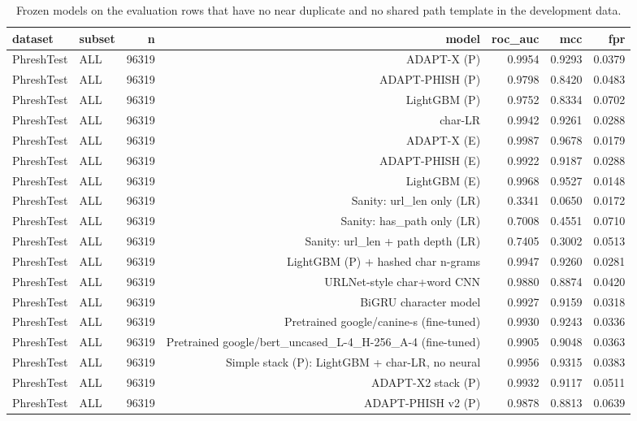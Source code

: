 \begin{table}[t]
\centering
\scriptsize
\caption{Frozen models on the evaluation rows that have no near duplicate and no shared path template in the development data.}
\label{tab:rev_R5_metrics_without_near_duplicates}
\begin{tabular}{llrrrrr}
\toprule
dataset & subset & n & model & roc\_auc & mcc & fpr \\
\midrule
PhreshTest & ALL & 96319 & ADAPT-X (P) & 0.9954 & 0.9293 & 0.0379 \\
PhreshTest & ALL & 96319 & ADAPT-PHISH (P) & 0.9798 & 0.8420 & 0.0483 \\
PhreshTest & ALL & 96319 & LightGBM (P) & 0.9752 & 0.8334 & 0.0702 \\
PhreshTest & ALL & 96319 & char-LR & 0.9942 & 0.9261 & 0.0288 \\
PhreshTest & ALL & 96319 & ADAPT-X (E) & 0.9987 & 0.9678 & 0.0179 \\
PhreshTest & ALL & 96319 & ADAPT-PHISH (E) & 0.9922 & 0.9187 & 0.0288 \\
PhreshTest & ALL & 96319 & LightGBM (E) & 0.9968 & 0.9527 & 0.0148 \\
PhreshTest & ALL & 96319 & Sanity: url\_len only (LR) & 0.3341 & 0.0650 & 0.0172 \\
PhreshTest & ALL & 96319 & Sanity: has\_path only (LR) & 0.7008 & 0.4551 & 0.0710 \\
PhreshTest & ALL & 96319 & Sanity: url\_len + path depth (LR) & 0.7405 & 0.3002 & 0.0513 \\
PhreshTest & ALL & 96319 & LightGBM (P) + hashed char n-grams & 0.9947 & 0.9260 & 0.0281 \\
PhreshTest & ALL & 96319 & URLNet-style char+word CNN & 0.9880 & 0.8874 & 0.0420 \\
PhreshTest & ALL & 96319 & BiGRU character model & 0.9927 & 0.9159 & 0.0318 \\
PhreshTest & ALL & 96319 & Pretrained google/canine-s (fine-tuned) & 0.9930 & 0.9243 & 0.0336 \\
PhreshTest & ALL & 96319 & Pretrained google/bert\_uncased\_L-4\_H-256\_A-4 (fine-tuned) & 0.9905 & 0.9048 & 0.0363 \\
PhreshTest & ALL & 96319 & Simple stack (P): LightGBM + char-LR, no neural & 0.9956 & 0.9315 & 0.0383 \\
PhreshTest & ALL & 96319 & ADAPT-X2 stack (P) & 0.9932 & 0.9117 & 0.0511 \\
PhreshTest & ALL & 96319 & ADAPT-PHISH v2 (P) & 0.9878 & 0.8813 & 0.0639 \\

\end{tabular}
\end{table}
